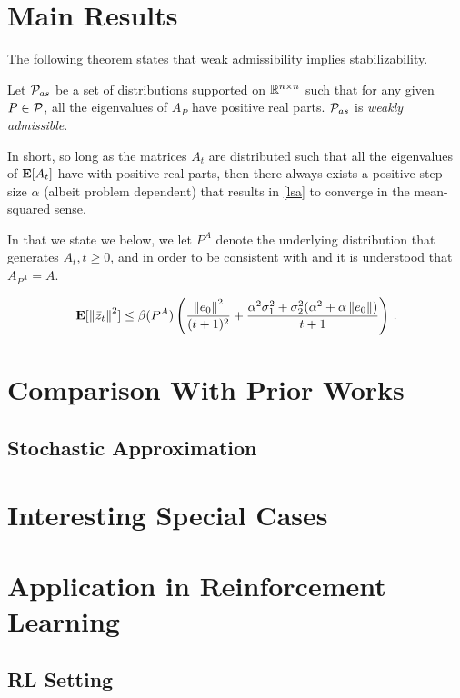 \documentclass{article}
\begin{document}
\section{Main Results}
The following theorem states that weak admissibility implies stabilizability.
\begin{theorem}
Let $\P_{as}$ be a set of distributions supported on $\R^{\ncn}$ such that for any given $P\in \P$, all the eigenvalues of $A_{P}$ have positive real parts. $\P_{as}$ is \emph{weakly admissible}.
\end{theorem}
In short, so long as the matrices $A_t$ are distributed such that all the eigenvalues of $\E[A_t]$ have with positive real parts, then there always exists a positive step size $\alpha$ (albeit problem dependent) that results in \eqref{lsa} to converge in the mean-squared sense.

In  that we state we below, we let $P^A$ denote the underlying distribution that generates $A_t, t\geq 0$, and in order to be consistent with  and  it is understood that $A_{P^A}=A$.
\begin{theorem}\label{thm:rate}
\begin{align}
\E[\norm{\zb_t}^2]
\leq \beta(P^A)
\left(\frac{\norm{e_0}^2}{(t+1)^2}+ \frac{\alpha^2{\sigma}_1^2+ {\sigma}_2^2 (\alpha^2+\alpha \norm{e_0})}{t+1} \right)\,.
\end{align}

\end{theorem}

\section{Comparison With Prior Works}

\subsection{Stochastic Approximation}

\section{Interesting Special Cases}

\section{Application in Reinforcement Learning}
\subsection{RL Setting}
\end{document}
